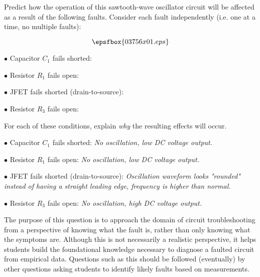 

Predict how the operation of this sawtooth-wave oscillator circuit will be affected as a result of the following faults.  Consider each fault independently (i.e. one at a time, no multiple faults):

$$\epsfbox{03756x01.eps}$$

\medskip
\item{$\bullet$} Capacitor $C_1$ fails shorted:
\vskip 5pt
\item{$\bullet$} Resistor $R_1$ fails open:
\vskip 5pt
\item{$\bullet$} JFET fails shorted (drain-to-source):
\vskip 5pt
\item{$\bullet$} Resistor $R_3$ fails open:
\medskip

For each of these conditions, explain {\it why} the resulting effects will occur.







\medskip
\item{$\bullet$} Capacitor $C_1$ fails shorted: {\it No oscillation, low DC voltage output.}
\vskip 5pt
\item{$\bullet$} Resistor $R_1$ fails open: {\it No oscillation, low DC voltage output.}
\vskip 5pt
\item{$\bullet$} JFET fails shorted (drain-to-source): {\it Oscillation waveform looks "rounded" instead of having a straight leading edge, frequency is higher than normal.}
\vskip 5pt
\item{$\bullet$} Resistor $R_3$ fails open: {\it No oscillation, high DC voltage output.}
\medskip







The purpose of this question is to approach the domain of circuit troubleshooting from a perspective of knowing what the fault is, rather than only knowing what the symptoms are.  Although this is not necessarily a realistic perspective, it helps students build the foundational knowledge necessary to diagnose a faulted circuit from empirical data.  Questions such as this should be followed (eventually) by other questions asking students to identify likely faults based on measurements.




